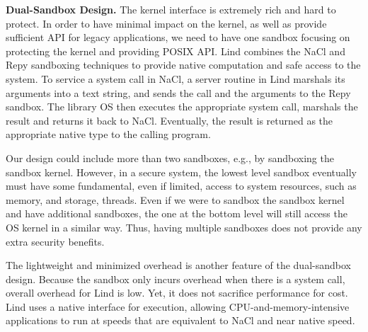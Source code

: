 \textbf{Dual-Sandbox Design.}
The kernel interface is extremely rich and hard to protect.
In order to have minimal impact on the kernel, as well as provide sufficient API for legacy applications,
we need to have one sandbox focusing on protecting the kernel and providing POSIX API.
Lind combines the NaCl and Repy sandboxing techniques to provide native computation and
safe access to the system.
%
To service a system call in NaCl, a server routine in Lind marshals its arguments into a text string,
and sends the call and the arguments to the Repy sandbox.
The library OS then executes the appropriate system call, marshals the result and
returns it back to NaCl. Eventually, the result is returned as the appropriate native type to the calling program.




Our design could include more than two sandboxes, e.g., by sandboxing the sandbox
kernel. However, in a secure system,
the lowest level sandbox eventually must have some fundamental,
even if limited, access to system resources, such as memory, and storage, threads.
Even if we were to sandbox the sandbox kernel and have additional sandboxes,
the one at the bottom level will still access the OS kernel in a similar way.
Thus, having multiple sandboxes does not provide any extra security benefits.

The lightweight and minimized overhead is another feature of the dual-sandbox design. Because the sandbox only
 incurs overhead when there is a system call, overall overhead for Lind is low.
 Yet, it does not sacrifice performance for cost.
Lind uses a native interface for execution,
allowing CPU-and-memory-intensive applications to run at speeds that are equivalent
 to NaCl and near native speed.